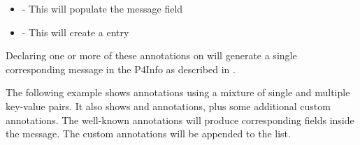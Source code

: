 \documentclass[11pt]{article}
\begin{document}
{\begin{itemize}
\item{}
 - This will populate the  message field%

\item{}
 - This will create a  entry%
\end{itemize}%

\noindent{}Declaring one or more of these annotations on  will
generate a single corresponding  message in the P4Info as described in
.%

The following example shows  annotations using a mixture of single and
multiple key-value pairs. It also shows  and  annotations,
plus some additional custom annotations. The well-known annotations will produce
corresponding fields inside the  message. The custom annotations will
be appended to the  list.%

}
\end{document}
